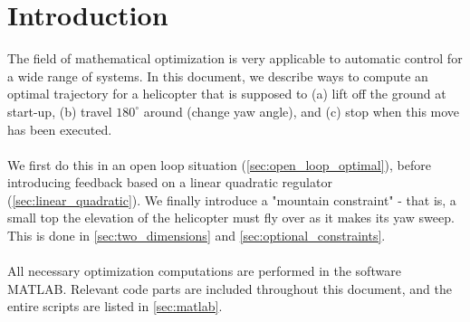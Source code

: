 \section{Introduction}\label{sec:intro}
The field of mathematical optimization is very applicable to automatic control for a wide range of systems. In this document, we describe ways to compute an optimal trajectory for a helicopter that is supposed to (a) lift off the ground at start-up, (b) travel $180^\circ$ around (change yaw angle), and (c) stop when this move has been executed.\\
\\
We first do this in an open loop situation (\cref{sec:open_loop_optimal}), before introducing feedback based on a linear quadratic regulator (\cref{sec:linear_quadratic}). We finally introduce a "mountain constraint" - that is, a small top the elevation of the helicopter must fly over as it makes its yaw sweep. This is done in \cref{sec:two_dimensions} and \cref{sec:optional_constraints}.\\
\\
All necessary optimization computations are performed in the software MATLAB. Relevant code parts are included throughout this document, and the entire scripts are listed in \cref{sec:matlab}.